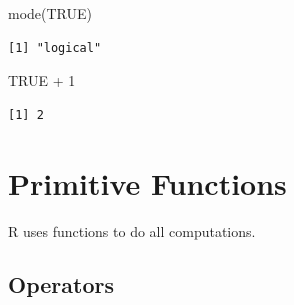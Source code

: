 \documentclass[
]{book}
\newenvironment{Shaded}{\begin{snugshade}}{\end{snugshade}}
\newcommand{\ConstantTok}[1]{\textcolor[rgb]{0.00,0.00,0.00}{#1}}
\newcommand{\DecValTok}[1]{\textcolor[rgb]{0.00,0.00,0.81}{#1}}
\newcommand{\FunctionTok}[1]{\textcolor[rgb]{0.00,0.00,0.00}{#1}}
\newcommand{\NormalTok}[1]{#1}
\newcommand{\SpecialCharTok}[1]{\textcolor[rgb]{0.00,0.00,0.00}{#1}}
\begin{document}
\begin{Shaded}
\begin{Highlighting}[]
\FunctionTok{mode}\NormalTok{(}\ConstantTok{TRUE}\NormalTok{)}
\end{Highlighting}
\end{Shaded}

\begin{verbatim}
[1] "logical"
\end{verbatim}

\begin{Shaded}
\begin{Highlighting}[]
\ConstantTok{TRUE} \SpecialCharTok{+} \DecValTok{1}
\end{Highlighting}
\end{Shaded}

\begin{verbatim}
[1] 2
\end{verbatim}

\hypertarget{primitive-functions}{%
\section{Primitive Functions}\label{primitive-functions}}

R uses functions to do all computations.

\hypertarget{operators}{%
\subsection{Operators}\label{operators}}
\end{document}
